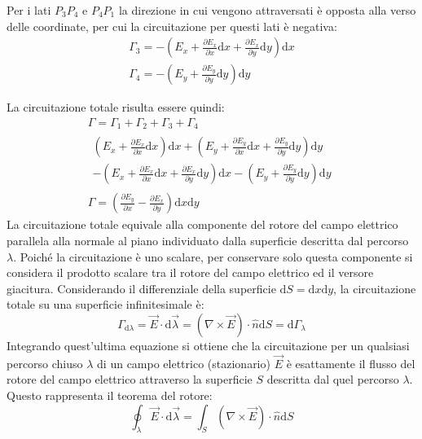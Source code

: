 \documentclass{article}
\newcommand{\df}{\mathrm{d}}
\numberwithin{equation}{subsection}
\begin{document}
Per i lati $P_3P_4$ e $P_4P_1$ la direzione in cui vengono attraversati è opposta alla verso delle coordinate, per cui la circuitazione per questi lati è negativa:
\begin{gather*}
    \Gamma_3=-\left(E_x+\displaystyle\frac{\partial E_x}{\partial x}\df  x+\frac{\partial E_x}{\partial y}\df  y\right)\df  x\\
    \Gamma_4=-\left(E_y+\displaystyle\frac{\partial E_y}{\partial y}\df  y\right)\df  y
\end{gather*} 

La circuitazione totale risulta essere quindi:
\begin{gather*}
    \Gamma=\Gamma_1+\Gamma_2+\Gamma_3+\Gamma_4\\
    \begin{matrix}
        \displaystyle\left(E_x+\frac{\partial E_x}{\partial x}\df  x\right)\df  x+\left(E_y+\frac{\partial E_y}{\partial x}\df  x+\frac{\partial E_y}{\partial y}\df  y\right)\df  y\\
        \displaystyle-\left(E_x+\frac{\partial E_x}{\partial x}\df  x+\frac{\partial E_x}{\partial y}\df  y\right)\df  x-\left(E_y+\frac{\partial E_y}{\partial y}\df  y\right)\df  y
    \end{matrix}\\
    \Gamma=\left(\displaystyle\frac{\partial E_y}{\partial x}-\frac{\partial E_x}{\partial y}\right)\df x\df y
\end{gather*}
La circuitazione totale equivale alla componente del rotore del campo elettrico parallela alla normale al piano individuato dalla superficie descritta dal percorso $\lambda$. 
Poiché la circuitazione è uno scalare, per conservare solo questa componente si considera il prodotto scalare tra il rotore del campo elettrico ed il versore giacitura. 
Considerando il differenziale della superficie $\df S=\df x\df y$, la circuitazione totale su una superficie infinitesimale è:
\begin{equation*}
    \Gamma_{\df\lambda}=\vec{E}\cdot \df\vec{\lambda}=({\nabla}\times\vec{E})\cdot \hat{n}\df S=\df\Gamma_\lambda
\end{equation*}
Integrando quest'ultima equazione si ottiene che la circuitazione per un qualsiasi percorso chiuso $\lambda$ di un campo elettrico (stazionario) $\vec{E}$ è esattamente il 
flusso del rotore del campo elettrico attraverso la superficie $S$ descritta dal quel percorso $\lambda$. Questo rappresenta il teorema del rotore: 
\begin{equation}
    \displaystyle\oint_{\lambda}\vec{E}\cdot \df\vec{\lambda}=\int_S({\nabla}\times\vec{E})\cdot\hat{n}\df S
\end{equation}
\end{document}
